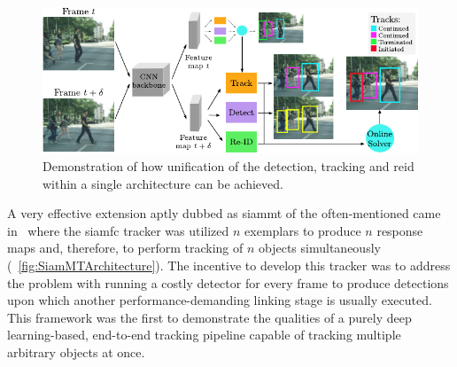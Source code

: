 \begin{figure}[!t]
    \centerline{\includegraphics[width=\linewidth]{figures/theoretical_foundations/motsiam_trackrcnn_architecture.pdf}}
    \caption[Siamese \gls{mot} with track R-CNN]{Demonstration of how unification of the detection, tracking and \gls{reid} within a single architecture can be achieved. }
    \label{fig:MultiSiamRCNN}
\end{figure}

A very effective extension aptly dubbed as \gls{siammt} of the often-mentioned came in~\cite{vaquero2021siammt} where the \gls{siamfc} tracker was utilized $n$ exemplars to produce $n$ response maps and, therefore, to perform tracking of $n$ objects simultaneously (\figtext{}~\ref{fig:SiamMTArchitecture}). The incentive to develop this tracker was to address the problem with running a costly detector for every frame to produce detections upon which another performance-demanding linking stage is usually executed. This framework was the first to demonstrate the qualities of a purely deep learning-based, end-to-end tracking pipeline capable of tracking multiple arbitrary objects at once.

